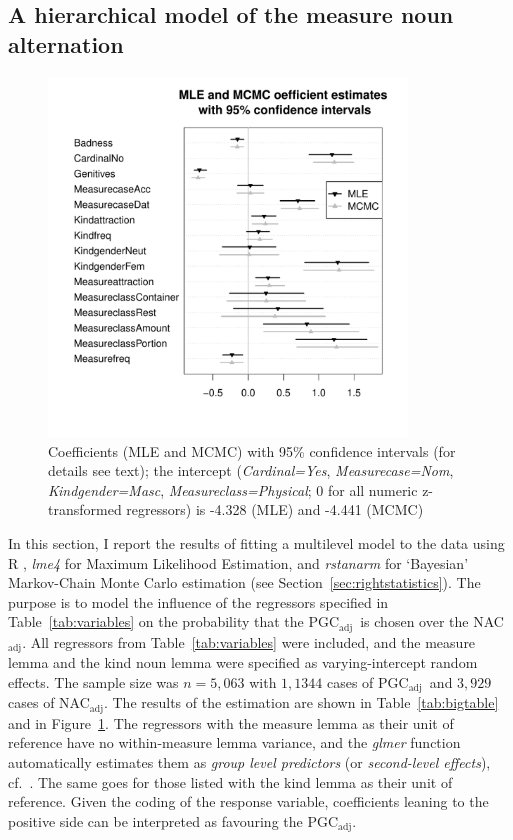\documentclass[USenglish]{article}
\newcommand{\Sub}[1]{\ensuremath{\mathrm{_{#1}}}}
\newcommand{\NACa}{NAC\Sub{adj}}
\newcommand{\PGCa}{PGC\Sub{adj}}
\begin{document}
\subsection{A hierarchical model of the measure noun alternation}
\label{sec:corpushierarchicalmodel}

\begin{figure}[hb!]
  \centering
  \includegraphics[width=0.85\textwidth]{../R/output/corpus_fixeffs_mle+mcmc}
  \caption{Coefficients (MLE and MCMC) with 95\% confidence intervals (for details see text); the intercept (\textit{Cardinal=Yes}, \textit{Measurecase=Nom}, \textit{Kindgender=Masc}, \textit{Measureclass=Physical}; 0 for all numeric z-transformed regressors) is -4.328 (MLE) and -4.441 (MCMC)}
  \label{fig:fixeffs}
\end{figure}

In this section, I report the results of fitting a multilevel model to the data using R \citep{R}, \textit{lme4} \citep{lme4} for Maximum Likelihood Estimation, and \textit{rstanarm} \citep{rstanarm} for `Bayesian' Markov-Chain Monte Carlo estimation (see Section~\ref{sec:rightstatistics}).
The purpose is to model the influence of the regressors specified in Table~\ref{tab:variables} on the probability that the \PGCa\ is chosen over the \NACa.
All regressors from Table~\ref{tab:variables} were included, and the measure lemma and the kind noun lemma were specified as varying-intercept random effects.
The sample size was $n=5,063$ with $1,1344$ cases of \PGCa\ and $3,929$ cases of \NACa.
The results of the estimation are shown in Table~\ref{tab:bigtable} and in Figure~\ref{fig:fixeffs}.
The regressors with the measure lemma as their unit of reference have no within-measure lemma variance, and the \textit{glmer} function automatically estimates them as \textit{group level predictors} (or \textit{second-level effects}), cf.\ \citet[265--269,302--304]{GelmanHill2006}.
The same goes for those listed with the kind lemma as their unit of reference.
Given the coding of the response variable, coefficients leaning to the positive side can be interpreted as favouring the \PGCa.
\end{document}
